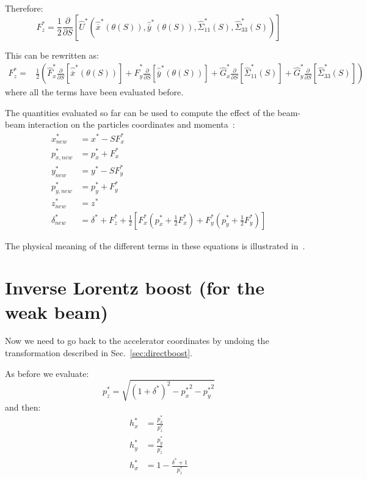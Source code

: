 Therefore:
\begin{equation}
F^*_z  =  \frac{1}{2}\frac{\partial }{\partial S} \left[
\hat{U}^*\left(\hat{\overline{x}}^*\left(\theta (S)\right), \hat{\overline{y}}^*\left(\theta (S)\right) , \hat{\Sigma}^*_{11}(S), \hat{\Sigma}^*_{33}(S)\right) 
\right]
\end{equation}

This can be rewritten as:
\begin{align}
F^*_z  =  &\frac{1}{2}\left(
\hat{F}^*_x \frac{\partial }{\partial S} \left[\hat{\overline{x}}^*\left(\theta (S)\right) \right]+
\hat{F}^*_y \frac{\partial }{\partial S} \left[\hat{\overline{y}}^*\left(\theta (S)\right) \right]+
\hat{G}^*_x\frac{\partial }{\partial S} \left[\hat{\Sigma}^*_{11}(S)\right]+
\hat{G}^*_y\frac{\partial }{\partial S} \left[\hat{\Sigma}^*_{33}(S)\right]\right)
\end{align}
where all the terms have been evaluated before.

The quantities evaluated so far can be used to compute the effect of the beam-beam interaction on the particles coordinates and momenta~\cite{hirata1}:
\begin{align}
x^*_{new} &= x^* - S {F}^*_x\\
p^*_{x, new} &= p^*_{x} + {F}^*_x\\
y^*_{new} &= y^* - S {F}^*_y\\
p^*_{y, new} &= p^*_{y} + {F}^*_y\\
z^*_{new} &= z^*\\
\delta^*_{new} &= \delta^* + {F}^*_z
+\frac{1}{2}\left[ 
{F}^*_x\left(p^*_{x} + \frac{1}{2}{F}^*_x\right)+
{F}^*_y\left(p^*_{y} + \frac{1}{2}{F}^*_y\right)
\right]
\end{align}

The physical meaning of the different terms in these equations is illustrated in~\cite{slides}.

\section{Inverse Lorentz boost (for the weak beam)}

Now we need to go back to the accelerator coordinates by undoing the transformation described in Sec.~\ref{sec:directboost}.

As before we evaluate:
\begin{equation}
p^*_z  =  \sqrt{\left(1+\delta^*\right)^2-{p_x^*}^2-{p_y^*}^2}
\end{equation}
and then:
\begin{align}
h^*_x &= \frac{p^*_x}{p^*_z}\\
h^*_y &= \frac{p^*_y}{p^*_z}\\
h^*_\sigma &= 1-\frac{\delta^*+1}{p^*_z}
\end{align}

